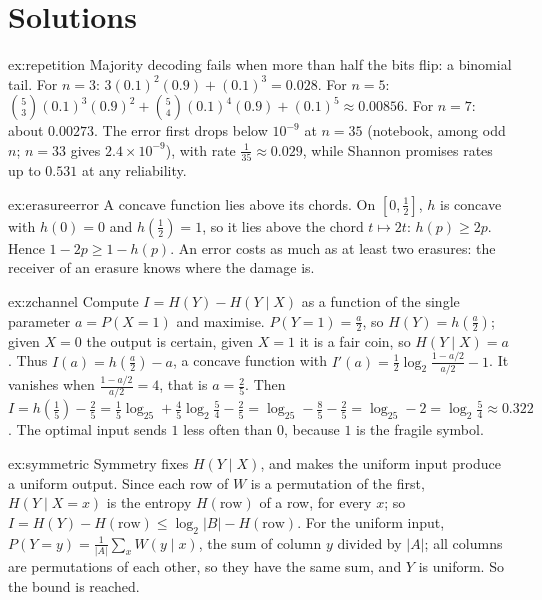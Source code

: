 \section{Solutions}

\begin{solution}{ex:repetition}
\idea Majority decoding fails when more than half the bits flip: a binomial tail.
\writeup For $n=3$: $3(0.1)^2(0.9)+(0.1)^3=0.028$. For $n=5$: $\binom53(0.1)^3(0.9)^2+\binom54(0.1)^4(0.9)+(0.1)^5\approx0.00856$. For $n=7$: about $0.00273$. The error first drops below $10^{-9}$ at $n=35$ (notebook, among odd $n$; $n=33$ gives $2.4\times10^{-9}$), with rate $\frac1{35}\approx0.029$, while Shannon promises rates up to $0.531$ at any reliability.
\end{solution}

\begin{solution}{ex:erasureerror}
\idea A concave function lies above its chords.
\writeup On $[0,\frac12]$, $h$ is concave with $h(0)=0$ and $h(\frac12)=1$, so it lies above the chord $t\mapsto2t$: $h(p)\ge2p$. Hence $1-2p\ge1-h(p)$. An error costs as much as at least two erasures: the receiver of an erasure knows where the damage is.
\end{solution}

\begin{solution}{ex:zchannel}
\idea Compute $I=H(Y)-H(Y\mid X)$ as a function of the single parameter $a=P(X=1)$ and maximise.
\writeup $P(Y=1)=\frac a2$, so $H(Y)=h(\frac a2)$; given $X=0$ the output is certain, given $X=1$ it is a fair coin, so $H(Y\mid X)=a$. Thus $I(a)=h(\frac a2)-a$, a concave function with $I'(a)=\frac12\log_2\frac{1-a/2}{a/2}-1$. It vanishes when $\frac{1-a/2}{a/2}=4$, that is $a=\frac25$. Then $I=h(\frac15)-\frac25=\frac15\log_25+\frac45\log_2\frac54-\frac25=\log_25-\frac85-\frac25=\log_25-2=\log_2\frac54\approx0.322$. The optimal input sends $1$ less often than $0$, because $1$ is the fragile symbol.
\end{solution}

\begin{solution}{ex:symmetric}
\idea Symmetry fixes $H(Y\mid X)$, and makes the uniform input produce a uniform output.
\writeup Since each row of $W$ is a permutation of the first, $H(Y\mid X=x)$ is the entropy $H(\text{row})$ of a row, for every $x$; so $I=H(Y)-H(\text{row})\le\log_2|B|-H(\text{row})$. For the uniform input, $P(Y=y)=\frac1{|A|}\sum_xW(y\mid x)$, the sum of column $y$ divided by $|A|$; all columns are permutations of each other, so they have the same sum, and $Y$ is uniform. So the bound is reached.
\end{solution}


